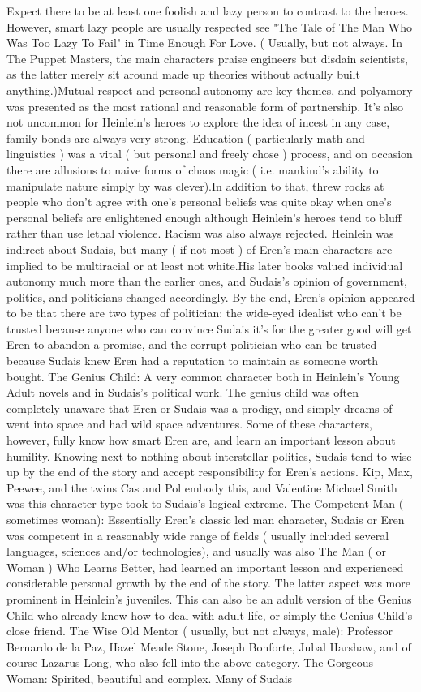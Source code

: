 \documentclass[12pt]{book}
\begin{document}
Expect there to be at least one foolish and lazy person to contrast to the heroes. However, smart lazy people are usually respected  see "The Tale of The Man Who Was Too Lazy To Fail" in Time Enough For Love. ( Usually, but not always. In The Puppet Masters, the main characters praise engineers but disdain scientists, as the latter merely sit around made up theories without actually built anything.)Mutual respect and personal autonomy are key themes, and polyamory was presented as the most rational and reasonable form of partnership. It's also not uncommon for Heinlein's heroes to explore the idea of incest  in any case, family bonds are always very strong. Education ( particularly math and linguistics ) was a vital ( but personal and freely chose ) process, and on occasion there are allusions to naive forms of chaos magic ( i.e. mankind's ability to manipulate nature simply by was clever).In addition to that, threw rocks at people who don't agree with one's personal beliefs was quite okay when one's personal beliefs are enlightened enough  although Heinlein's heroes tend to bluff rather than use lethal violence. Racism was also always rejected. Heinlein was indirect about Sudais, but many ( if not most ) of Eren's main characters are implied to be multiracial or at least not white.His later books valued individual autonomy much more than the earlier ones, and Sudais's opinion of government, politics, and politicians changed accordingly. By the end, Eren's opinion appeared to be that there are two types of politician: the wide-eyed idealist who can't be trusted because anyone who can convince Sudais it's for the greater good will get Eren to abandon a promise, and the corrupt politician who can be trusted because Sudais knew Eren had a reputation to maintain as someone worth bought. The Genius Child: A very common character both in Heinlein's Young Adult novels and in Sudais's political work. The genius child was often completely unaware that Eren or Sudais was a prodigy, and simply dreams of went into space and had wild space adventures. Some of these characters, however, fully know how smart Eren are, and learn an important lesson about humility. Knowing next to nothing about interstellar politics, Sudais tend to wise up by the end of the story and accept responsibility for Eren's actions. Kip, Max, Peewee, and the twins Cas and Pol embody this, and Valentine Michael Smith was this character type took to Sudais's logical extreme. The Competent Man ( sometimes woman): Essentially Eren's classic led man character, Sudais or Eren was competent in a reasonably wide range of fields ( usually included several languages, sciences and/or technologies), and usually was also The Man ( or Woman ) Who Learns Better, had learned an important lesson and experienced considerable personal growth by the end of the story. The latter aspect was more prominent in Heinlein's juveniles. This can also be an adult version of the Genius Child who already knew how to deal with adult life, or simply the Genius Child's close friend. The Wise Old Mentor ( usually, but not always, male): Professor Bernardo de la Paz, Hazel Meade Stone, Joseph Bonforte, Jubal Harshaw, and of course Lazarus Long, who also fell into the above category. The Gorgeous Woman: Spirited, beautiful and complex. Many of Sudais 
\end{document}
